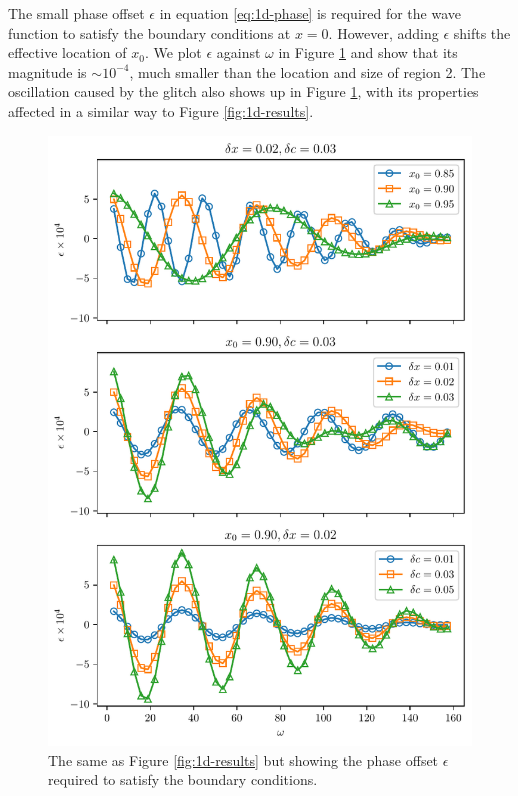 The small phase offset \(\epsilon\) in equation \ref{eq:1d-phase} is required for the wave function to satisfy the boundary conditions at \(x = 0\). However, adding \(\epsilon\) shifts the effective location of \(x_0\). We plot \(\epsilon\) against \(\omega\) in Figure \ref{fig:1d-phase} and show that its magnitude is \(\sim 10^{-4}\), much smaller than the location and size of region 2. The oscillation caused by the glitch also shows up in Figure \ref{fig:1d-phase}, with its properties affected in a similar way to Figure \ref{fig:1d-results}.

\begin{figure}
    \centering
    \includegraphics{figures/glitch-1d-example-phase.pdf}
    \caption{The same as Figure \ref{fig:1d-results} but showing the phase offset \(\epsilon\) required to satisfy the boundary conditions.}
    \label{fig:1d-phase}
\end{figure}

